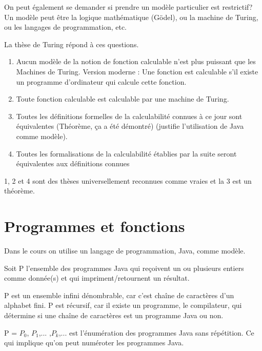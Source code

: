 On peut également se demander si prendre un modèle particulier est restrictif? Un modèle peut être la logique mathématique (Gödel), ou la machine de Turing, ou les langages de programmation, etc.

La thèse de Turing répond à ces questions.
\begin{enumerate}
	\item Aucun modèle de la notion de fonction calculable n'est plus puissant que les Machines de Turing.
		Version moderne : Une fonction est calculable s'il existe un programme d'ordinateur qui calcule cette fonction.
	\item Toute fonction calculable est calculable par une machine de Turing.
	\item Toutes les définitions formelles de la calculabilité connues à ce jour sont équivalentes (Théorème, ça a été démontré) (justifie l'utilisation de Java comme modèle).
	\item Toutes les formalisations de la calculabilité établies par la
		suite seront équivalentes aux définitions connues
\end{enumerate}
1, 2 et 4 sont des thèses universellement reconnues comme vraies et la 3 est un théorème.


\section{Programmes et fonctions}
\label{sec:programmes_et_fonctions}
Dans le cours on utilise un langage de programmation, Java, comme modèle.

\begin{mydef}[P]
	Soit P l'ensemble des programmes Java qui reçoivent un ou plusieurs entiers comme donnée(s) et qui impriment/retournent un résultat.
\end{mydef}

\begin{myprop}
	P est un ensemble infini dénombrable, car c'est chaîne de caractères d'un alphabet fini. P est récursif, car il existe un programme, le compilateur, qui détermine si une chaîne de caractères est un programme Java ou non.
\end{myprop}

\begin{mydef}[Énumération de P]
	P = $P_0$, $P_1$,... ,$P_k$,... est l'énumération des programmes Java sans répétition. Ce qui implique qu'on peut numéroter les programmes Java.\\
\end{mydef}

